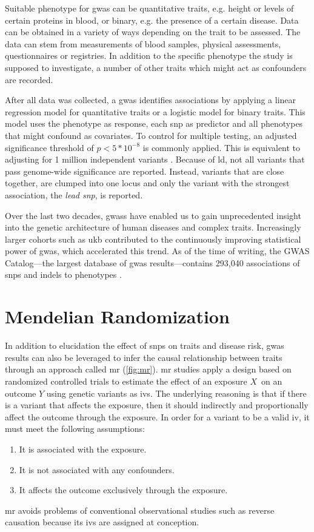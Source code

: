\documentclass[draft]{scrbook}
\begin{document}
Suitable phenotype for \gls{gwas} can be quantitative traits, e.g. height or levels of certain proteins in blood, or binary, e.g. the presence of a certain disease.
Data can be obtained in a variety of ways depending on the trait to be assessed.
The data can stem from measurements of blood samples, physical assessments, questionnaires or registries.
In addition to the specific phenotype the study is supposed to investigate, a number of other traits which might act as confounders are recorded.

After all data was collected, a \gls{gwas} identifies associations by applying a linear regression model for quantitative traits or a logistic model for binary traits.
This model uses the phenotype as response, each \gls{snp} as predictor and all phenotypes that might confound as covariates.
To control for multiple testing, an adjusted significance threshold of $p < 5 * 10^{-8}$ is commonly applied.
This is equivalent to adjusting for 1 million independent variants \cite{Belmont2005}.
Because of \gls{ld}, not all variants that pass genome-wide significance are reported.
Instead, variants that are close together, are clumped into one locus and only the variant with the strongest association, the \textit{lead \gls{snp}}, is reported.

Over the last two decades, \glspl{gwas} have enabled us to gain unprecedented insight into the genetic architecture of human diseases and complex traits.
Increasingly larger cohorts such as \gls{ukb} contributed to the continuously improving statistical power of \gls{gwas}, which accelerated this trend.
As of the time of writing, the GWAS Catalog---the largest database of \gls{gwas} results---contains 293,040 associations of \glspl{snp} and \glspl{indel} to phenotypes \cite{Buniello2019}.

\section{Mendelian Randomization}
In addition to elucidation the effect of \glspl{snp} on traits and disease risk, \gls{gwas} results can also be leveraged to infer the causal relationship between traits through an approach called \gls{mr} (\cref{fig:mr}).
\Gls{mr} studies apply a design based on randomized controlled trials to estimate the effect of an exposure $X$ on an outcome $Y$ using genetic variants as \glspl{iv}.
The underlying reasoning is that if there is a variant that affects the exposure, then it should indirectly and proportionally affect the outcome through the exposure.
In order for a variant to be a valid \gls{iv}, it must meet the following assumptions:
\begin{enumerate}[label=\bfseries IV\arabic*)]
    \item It is associated with the exposure.
    \item It is not associated with any confounders.
    \item It affects the outcome exclusively through the exposure.
\end{enumerate}
\Gls{mr} avoids problems of conventional observational studies such as reverse causation because its \glspl{iv} are assigned at conception.
\end{document}
